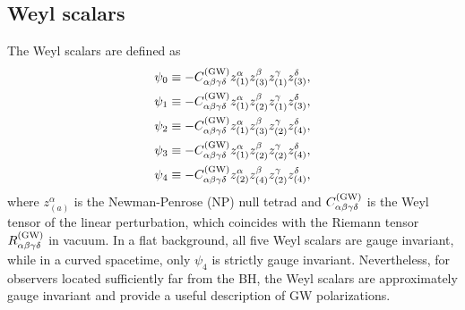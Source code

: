 \documentclass[reprint,amsmath,amssymb,aps,prd]{revtex4-2}
\begin{document}
\subsection{Weyl scalars}
The Weyl scalars are defined as \cite{Chandrasekhar1983}
\begin{subequations}
\label{eq_4:Weyl_definitions}
\begin{align}
\psi_0&\equiv-C^{\rm(GW)}_{\alpha\beta\gamma\delta}z_{(1)}^{\alpha}z_{(3)}^{\beta}z_{(1)}^{\gamma}z_{(3)}^{\delta},\\
\psi_1&\equiv-C^{\rm(GW)}_{\alpha\beta\gamma\delta}z_{(1)}^{\alpha}z_{(2)}^{\beta}z_{(1)}^{\gamma}z_{(3)}^{\delta},\\
\psi_2&\equiv-C^{\rm(GW)}_{\alpha\beta\gamma\delta}z_{(1)}^{\alpha}z_{(3)}^{\beta}z_{(2)}^{\gamma}z_{(4)}^{\delta},\\
\psi_3&\equiv-C^{\rm(GW)}_{\alpha\beta\gamma\delta}z_{(1)}^{\alpha}z_{(2)}^{\beta}z_{(2)}^{\gamma}z_{(4)}^{\delta},\\
\psi_4&\equiv-C^{\rm(GW)}_{\alpha\beta\gamma\delta}z_{(2)}^{\alpha}z_{(4)}^{\beta}z_{(2)}^{\gamma}z_{(4)}^{\delta},
\end{align}
\end{subequations}
where $z_{(a)}^{\alpha}$ is the Newman-Penrose (NP) null tetrad and $C^{\rm(GW)}_{\alpha\beta\gamma\delta}$ is the Weyl tensor of the linear perturbation, which coincides with the Riemann tensor $R^{\rm(GW)}_{\alpha\beta\gamma\delta}$ in vacuum. In a flat background, all five Weyl scalars are gauge invariant, while in a curved spacetime, only $\psi_4$ is strictly gauge invariant. Nevertheless, for observers located sufficiently far from the BH, the Weyl scalars are approximately gauge invariant and provide a useful description of GW polarizations.
\end{document}
